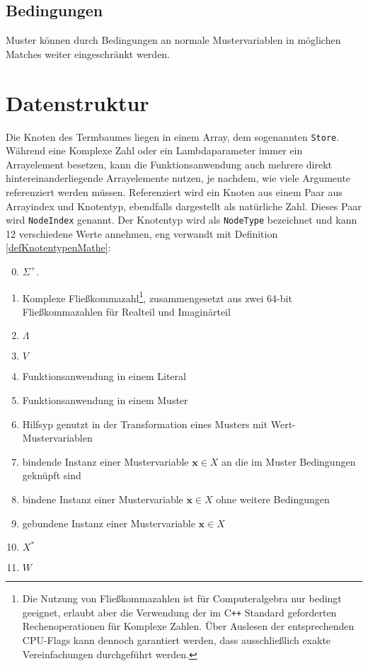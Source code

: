 \subsection{Bedingungen} \label{subsubsecBedingungen}
Muster können durch Bedingungen an normale Mustervariablen in möglichen Matches weiter eingeschränkt werden.






\section{Datenstruktur}
Die Knoten des Termbaumes liegen in einem Array, dem sogenannten \verb|Store|. Während eine Komplexe Zahl oder ein Lambdaparameter immer ein Arrayelement besetzen, kann die Funktionsanwendung auch mehrere direkt hintereinanderliegende Arrayelemente nutzen, je nachdem, wie viele Argumente referenziert werden müssen. Referenziert wird ein Knoten aus einem Paar aus Arrayindex und Knotentyp, ebendfalls dargestellt als natürliche Zahl. Dieses Paar wird \verb|NodeIndex| genannt. Der Knotentyp wird als \verb|NodeType| bezeichnet und kann 12 verschiedene Werte annehmen, eng verwandt mit Definition \ref{defKnotentypenMathe}:
\begin{enumerate}
	\setcounter{enumi}{-1} %
	\item {$\Sigma^+$.}
	\item {Komplexe Fließkommazahl\footnote{Die Nutzung von Fließkommazahlen ist für Computeralgebra nur bedingt geeignet, erlaubt aber die Verwendung der im C\texttt{++} Standard geforderten Rechenoperationen für Komplexe Zahlen. Über Auslesen der entsprechenden CPU-Flags kann dennoch garantiert werden, dass ausschließlich exakte Vereinfachungen durchgeführt werden.}, zusammengesetzt aus zwei 64-bit Fließkommazahlen für Realteil und Imaginärteil}
	\item {$\Lambda$}
	\item {$V$}
	\item {Funktionsanwendung in einem Literal}
	\item {Funktionsanwendung in einem Muster}
	\item {Hilfsyp genutzt in der Transformation eines Musters mit Wert-Mustervariablen}
	\item {bindende Instanz einer Mustervariable $\mathbf x \in X$ an die im Muster Bedingungen geknüpft sind}
	\item {bindene Instanz einer Mustervariable $\mathbf x \in X$ ohne weitere Bedingungen}
	\item {gebundene Instanz einer Mustervariable $\mathbf x \in X$}
	\item {$X^*$}
	\item {$W$}
\end{enumerate}
